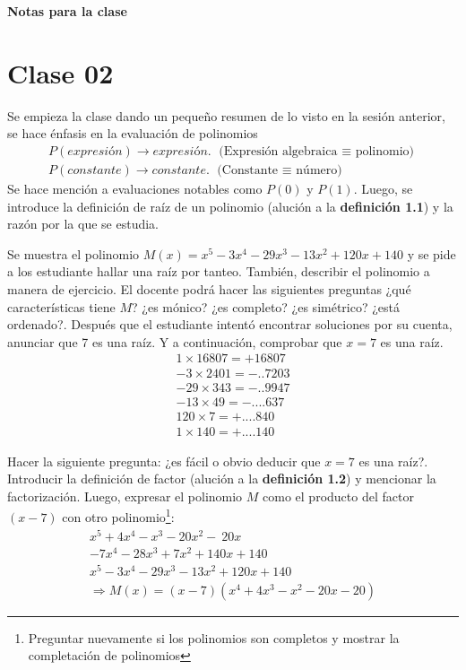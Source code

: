 \documentclass[12pt]{article}
\begin{document}
    \begin{center}
        \textbf{\Large Notas para la clase}
    \end{center}

    \section{Clase 02}
    {
        Se empieza la clase dando un pequeño resumen de lo visto en la sesión anterior, se hace énfasis en la evaluación de polinomios
        \begin{gather*}
            P(expresión) \rightarrow expresión.\mbox{ (Expresión algebraica $\equiv$ polinomio)}\\
            P(constante) \rightarrow constante.\mbox{ (Constante $\equiv$ número)}
        \end{gather*}
        Se hace mención a evaluaciones notables como $P(0)$ y $P(1)$. Luego, se introduce la definición de raíz de un polinomio (alución a la \textbf{definición 1.1}) y la razón por la que se estudia.

        Se muestra el polinomio $M(x) = x^5 - 3x^4 - 29x^3 - 13x^2 + 120x + 140$ y se pide a los estudiante hallar una raíz por tanteo.
        También, describir el polinomio a manera de ejercicio. El docente podrá hacer las siguientes preguntas ¿qué características tiene $M$? ¿es mónico? ¿es completo? ¿es simétrico? ¿está ordenado?.
        Después que el estudiante intentó encontrar soluciones por su cuenta, anunciar que 7 es una raíz. Y a continuación, comprobar que $x = 7$ es una raíz.
        \begin{align*}
              1\times 16807= +16807\\
             -3\times 2401 = -\mbox{..}7203\\
            -29\times 343  = -\mbox{..}9947\\
            -13\times 49   = -\mbox{....}637\\
            120\times 7    = +\mbox{....}840\\
              1\times 140  = +\mbox{....}140
        \end{align*}

        Hacer la siguiente pregunta: ¿es fácil o obvio deducir que $x = 7$ es una raíz?.
        Introducir la definición de factor (alución a la \textbf{definición 1.2}) y mencionar la factorización.
        Luego, expresar el polinomio $M$ como el producto del factor $(x - 7)$ con otro polinomio\footnote{Preguntar nuevamente si los polinomios son completos y mostrar la completación de polinomios}:
        \begin{align*}
            x^5 + 4x^4 - x^3 - 20x^2 - \:20x \hspace{3em}\\
            - 7x^4 - 28x^3 + 7x^2 + 140x + 140\\
            x^5 - 3x^4 - 29x^3 - 13x^2 + 120x + 140\\
            \Rightarrow M(x) = (x - 7)(x^4 + 4x^3 - x^2 - 20x - 20)
        \end{align*}

}
\end{document}
